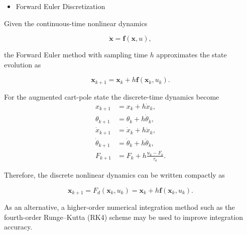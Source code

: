 \begin{itemize}
    \item Forward Euler Discretization
\end{itemize}

Given the continuous-time nonlinear dynamics

\begin{equation}
\dot{\mathbf{x}} = \boldsymbol{f}(\mathbf{x},u),
\end{equation}

the Forward Euler method with sampling time \(h\) approximates the state evolution as

\begin{equation}
\mathbf{x}_{k+1}
=
\mathbf{x}_k
+
h \boldsymbol{f}(\mathbf{x}_k,u_k).
\end{equation}

For the augmented cart-pole state the discrete-time dynamics become
\begin{align}
x_{k+1}
&=
x_k + h \dot{x}_k, \\
\theta_{k+1}
&=
\theta_k + h \dot{\theta}_k, \\
\dot{x}_{k+1}
&=
\dot{x}_k + h \ddot{x}_k, \\
\dot{\theta}_{k+1}
&=
\dot{\theta}_k + h \ddot{\theta}_k, \\
F_{k+1}
&=
F_k + h \frac{u_k - F_k}{\tau_a}.
\end{align}

Therefore, the discrete nonlinear dynamics can be written compactly as

\begin{equation}
\mathbf{x}_{k+1}
=
F_d(\mathbf{x}_k,u_k)
=
\mathbf{x}_k + h \boldsymbol{f}(\mathbf{x}_k,u_k).
\end{equation}

As an alternative, a higher-order numerical integration method such as the fourth-order Runge--Kutta (RK4) scheme may be used to improve integration accuracy.

